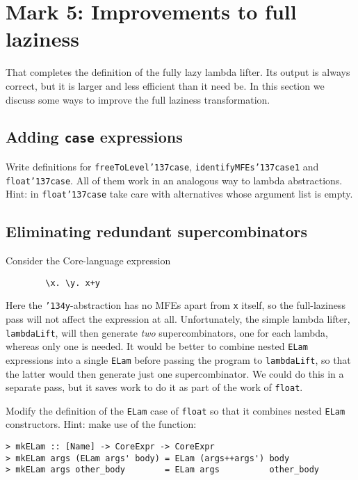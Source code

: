         \section{Mark 5: Improvements to full laziness}

That completes the definition of the fully lazy lambda lifter.
Its output is always correct, but it is larger and less
efficient than it need be.  In this section we discuss some ways
to improve the full laziness transformation.

\subsection{Adding \mbox{\tt case} expressions}

\begin{exercise}
Write definitions for \mbox{\tt freeToLevel{\char'137}case}, \mbox{\tt identifyMFEs{\char'137}case1}
and \mbox{\tt float{\char'137}case}.  All of them
work in an analogous way to lambda abstractions.
Hint: in \mbox{\tt float{\char'137}case} take care with alternatives whose argument list
is empty.
\end{exercise}

\subsection{Eliminating redundant supercombinators}

Consider the Core-language expression
\begin{verbatim}
        \x. \y. x+y
\end{verbatim}
Here the \mbox{\tt {\char'134}y}-abstraction has no MFEs apart from \mbox{\tt x} itself, so the
full-laziness pass will not affect the expression at all.  Unfortunately,
the simple lambda lifter, \mbox{\tt lambdaLift}, will then generate {\em two\/}
supercombinators,
one for each lambda, whereas only one is needed.
It would be better to combine nested \mbox{\tt ELam}
expressions into a single \mbox{\tt ELam} before passing the program to \mbox{\tt lambdaLift},
so that the latter would then generate just one supercombinator.
We could do this in a separate pass, but it saves work to do it as part of
the work of \mbox{\tt float}.
\begin{exercise}
Modify the definition of the \mbox{\tt ELam} case of \mbox{\tt float} so that it combines
nested \mbox{\tt ELam} constructors.  Hint: make use of the function:
\begin{verbatim}
> mkELam :: [Name] -> CoreExpr -> CoreExpr
> mkELam args (ELam args' body) = ELam (args++args') body
> mkELam args other_body        = ELam args          other_body
\end{verbatim}
%
%
%
\end{exercise}

